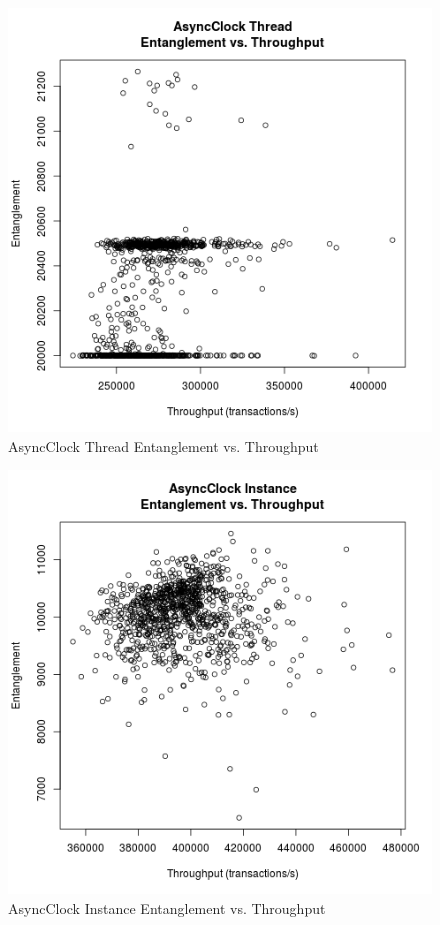 \begin{figure}
\center
\includegraphics[height=.4\textheight]{async_thread_throughput_entanglement.png}
\caption{AsyncClock Thread Entanglement vs. Throughput}
\label{async_thread_throughput_entanglement}
\end{figure}

\begin{figure}
\center
\includegraphics[height=.4\textheight]{async_instance_throughput_entanglement.png}
\caption{AsyncClock Instance Entanglement vs. Throughput}
\label{async_instance_throughput_entanglement}
\end{figure}

